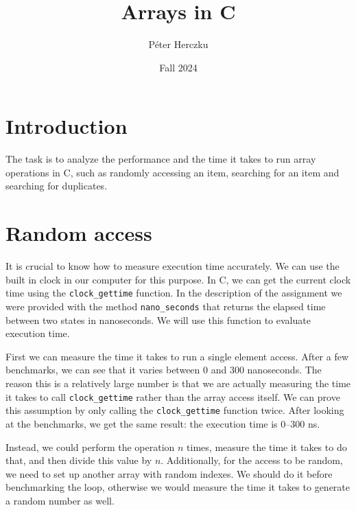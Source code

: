 \documentclass[a4paper,11pt]{article}
\begin{document}
\title{
    \textbf{Arrays in C}
}
\author{Péter Herczku}
\date{Fall 2024}

\maketitle

\section*{Introduction}

The task is to analyze the performance and the time it takes to run array operations in C, such as randomly accessing an item, searching for an item and searching for duplicates.

\section*{Random access}

It is crucial to know how to measure execution time accurately.
We can use the built in clock in our computer for this purpose.
In C, we can get the current clock time using the {\tt clock\_gettime} function.
In the description of the assignment we were provided with the method {\tt nano\_seconds} that returns the elapsed time between two states in nanoseconds.
We will use this function to evaluate execution time.

First we can measure the time it takes to run a single element access.
After a few benchmarks, we can see that it varies between 0 and 300 nanoseconds.
The reason this is a relatively large number is that we are actually measuring the time it takes to call {\tt clock\_gettime} rather than the array access itself.
We can prove this assumption by only calling the {\tt clock\_gettime} function twice.
After looking at the benchmarks, we get the same result: the execution time is 0--300 ns.

Instead, we could perform the operation $n$ times, measure the time it takes to do that, and then divide this value by $n$.
Additionally, for the access to be random, we need to set up another array with random indexes.
We should do it before benchmarking the loop, otherwise we would measure the time it takes to generate a random number as well.
\end{document}
